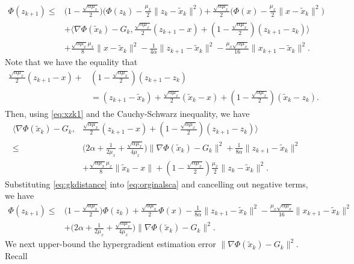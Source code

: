 \documentclass{osudissert96}
\begin{document}
\begin{align}\label{eq:orginalsca}
\Phi(z_{k+1})\leq& \big(1-\frac{\sqrt{\alpha\mu_x}}{2}\big) \big(\Phi(z_k) -\frac{\mu_x}{2}\|z_k-\widetilde x_k\|^2\big) + \frac{\sqrt{\alpha\mu_x}}{2} \big(\Phi(x) -\frac{\mu_x}{2}\|x-\widetilde x_k\|^2 \big)   \nonumber
\\&+\big \langle \nabla\Phi(\widetilde x_k)-G_k, \frac{\sqrt{\alpha\mu_x}}{2}(z_{k+1}-x) + (1-\frac{\sqrt{\alpha\mu_x}}{2}) (z_{k+1}-z_k) \big\rangle \nonumber
\\&+\frac{\sqrt{\alpha\mu_x}\mu_x}{8}\|x-\widetilde x_k\|^2-\frac{1}{4\alpha} \|z_{k+1}-\widetilde x_k\|^2 - \frac{\mu_x\sqrt{\alpha\mu_x}}{16} \|x_{k+1}-\widetilde x_k\|^2.
\end{align}
Note that  we have the equality that 
\begin{align}\label{eq:xzk1}
\frac{\sqrt{\alpha\mu_x}}{2}(z_{k+1}-x) + &(1-\frac{\sqrt{\alpha\mu_x}}{2}) (z_{k+1}-z_k) \nonumber
\\& =  (z_{k+1}-\widetilde x_k) + \frac{\sqrt{\alpha\mu_x}}{2} (\widetilde x_k - x) + (1-\frac{\sqrt{\alpha\mu_x}}{2})(\widetilde x_k-z_k).
\end{align}
Then, using \cref{eq:xzk1} and the Cauchy-Schwarz inequality, we have
\begin{align}\label{eq:gkdistance}
\big \langle \nabla\Phi(\widetilde x_k)-G_k, &\frac{\sqrt{\alpha\mu_x}}{2}(z_{k+1}-x) + (1-\frac{\sqrt{\alpha\mu_x}}{2}) (z_{k+1}-z_k) \big\rangle \nonumber
\\\leq & \Big(2\alpha+\frac{1}{2\mu_x} +\frac{\sqrt{\alpha\mu_x}}{4\mu_x}\Big)\|\nabla\Phi(\widetilde x_k)-G_k\|^2 + \frac{1}{8\alpha}\|z_{k+1}-\widetilde x_k\|^2
 \nonumber
\\&  +   \frac{\sqrt{\alpha\mu_x}\mu_x}{8} \|\widetilde x_k - x\|+ (1-\frac{\sqrt{\alpha\mu_x}}{2})\frac{\mu_x}{2} \|z_k-\widetilde x_k\|^2.
\end{align}
Substituting \cref{eq:gkdistance} into \cref{eq:orginalsca} and cancelling out negative terms, we have 
\begin{align}\label{cocoinasca}
\Phi(z_{k+1})\leq & \big(1-\frac{\sqrt{\alpha\mu_x}}{2}\big) \Phi(z_k) + \frac{\sqrt{\alpha\mu_x}}{2} \Phi(x) -\frac{1}{8\alpha} \|z_{k+1}-\widetilde x_k\|^2 - \frac{\mu_x\sqrt{\alpha\mu_x}}{16} \|x_{k+1}-\widetilde x_k\|^2 \nonumber
\\&+ \Big(2\alpha+\frac{1}{2\mu_x} +\frac{\sqrt{\alpha\mu_x}}{4\mu_x}\Big)\|\nabla\Phi(\widetilde x_k)-G_k\|^2.
\end{align}
We next upper-bound the hypergradient estimation error $\|\nabla\Phi(\widetilde x_k)-G_k\|^2$. Recall  
\end{document}
